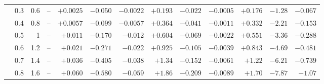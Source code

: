 \documentclass[11pt,a4paper]{article}
\begin{document}
\begin{table}[htbp]
\begin{tabular}{rrrrrrrrrrrrr}
 & 0.3 & 0.6 & -- & $+0.0025$ & $-0.050$ & $-0.0022$ & $+0.193$ & $-0.022$ & $-0.0005$ & $+0.176$ & $-1.28$ & $-0.067$ \\
 & 0.4 & 0.8 & -- & $+0.0057$ & $-0.099$ & $-0.0057$ & $+0.364$ & $-0.041$ & $-0.0011$ & $+0.332$ & $-2.21$ & $-0.153$ \\
 & 0.5 & 1 & -- & $+0.011$ & $-0.170$ & $-0.012$ & $+0.604$ & $-0.069$ & $-0.0022$ & $+0.551$ & $-3.36$ & $-0.288$ \\
 & 0.6 & 1.2 & -- & $+0.021$ & $-0.271$ & $-0.022$ & $+0.925$ & $-0.105$ & $-0.0039$ & $+0.843$ & $-4.69$ & $-0.481$ \\
 & 0.7 & 1.4 & -- & $+0.036$ & $-0.405$ & $-0.038$ & $+1.34$ & $-0.152$ & $-0.0061$ & $+1.22$ & $-6.21$ & $-0.739$ \\
 & 0.8 & 1.6 & -- & $+0.060$ & $-0.580$ & $-0.059$ & $+1.86$ & $-0.209$ & $-0.0089$ & $+1.70$ & $-7.87$ & $-1.07$ \\
\bottomrule
\end{tabular}
\end{table}
\end{document}
